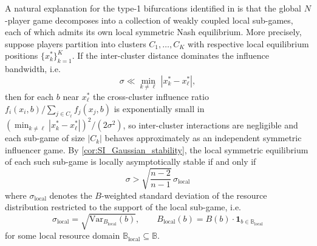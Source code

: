 \documentclass{article}
\begin{document}
                A natural explanation for the type-1 bifurcations identified in  is that the global $N$-player game decomposes into a collection of weakly coupled local sub-games, each of which admits its own local symmetric Nash equilibrium. More precisely, suppose players partition into clusters $C_1,\ldots,C_K$ with respective local equilibrium positions $\{x_k^*\}_{k=1}^K$. If the inter-cluster distance dominates the influence bandwidth, i.e.
                \begin{equation}\label{eq:decoupling_condition}
                    \sigma \ll \min_{k \neq \ell}\,|x_k^* - x_\ell^*|,
                \end{equation}
                then for each $b$ near $x_\ell^*$ the cross-cluster influence ratio $f_i(x_i,b)\big/\sum_{j\in C_\ell}f_j(x_j,b)$ is exponentially small in $(\min_{k\neq\ell}|x_k^*-x_\ell^*|)^2/(2\sigma^2)$, so inter-cluster interactions are negligible and each sub-game of size $|C_k|$ behaves approximately as an independent symmetric influencer game. By \cref{cor:SI_Gaussian_stability}, the local symmetric equilibrium of each such sub-game is locally asymptotically stable if and only if
                \begin{equation}\label{eq:local_stability}
                    \sigma > \sqrt{\frac{n-2}{n-1}}\,\sigma_{\mathrm{local}}
                \end{equation}
                where $\sigma_{\mathrm{local}}$ denotes the $B$-weighted standard deviation of the resource distribution restricted to the support of the local sub-game, i.e.
                \begin{equation}
                    \sigma_{\mathrm{local}} = \sqrt{\mathrm{Var}_{B_{\mathrm{local}}}(b)}, \qquad 
                    B_{\mathrm{local}}(b) = B(b)\cdot \mathbf{1}_{b \in \mathbb{B}_{\mathrm{local}}}
                \end{equation}
                for some local resource domain $\mathbb{B}_{\mathrm{local}} \subseteq \mathbb{B}$.
\end{document}
